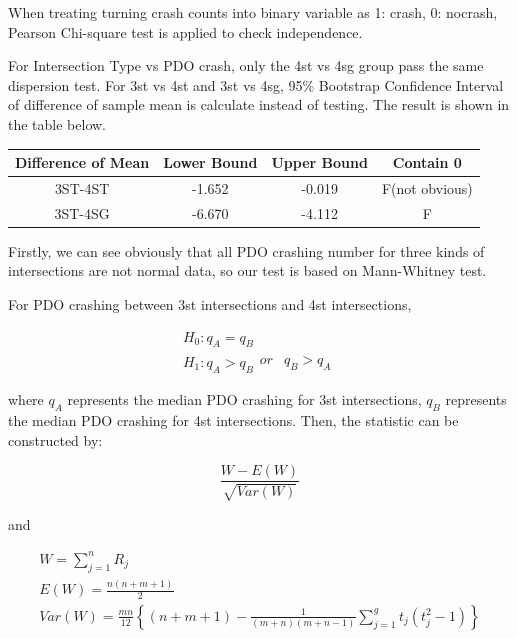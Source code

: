 \documentclass[11pt]{scrartcl} %
\begin{document}
When treating turning crash counts into binary variable as 1: crash, 0: nocrash, Pearson Chi-square test is applied to check independence.

For Intersection Type vs PDO crash, only the 4st vs 4sg group pass the same dispersion test. For 3st vs 4st and 3st vs 4sg, 95\% Bootstrap Confidence Interval of difference of sample mean is calculate instead of testing. The result is shown in the table below.

\begin{table}[H]
\begin{tabular}{|c|c|c|c|}
\hline
Difference of Mean  & Lower Bound & Upper Bound & Contain 0 \\
\hline
3ST-4ST & -1.652 & -0.019 & F(not obvious) \\
\hline
3ST-4SG   & -6.670  & -4.112  & F \\
\hline
\end{tabular}
\end{table}

Firstly, we can see obviously that all PDO crashing number for three kinds of intersections are not normal data, so our test is based on Mann-Whitney test.

\par

For PDO crashing between 3st intersections and 4st intersections,

\begin{equation*}
\begin{array}{l}
{H_0}:{q_A} = {q_B}\\
{H_1}:{q_A} > {q_B}\begin{array}{*{20}{c}}
{or}&{{q_B} > {q_A}}
\end{array}
\end{array}
\end{equation*}

where ${q_A}$ represents the median PDO crashing for 3st intersections, $q_B$ represents the median PDO crashing for 4st intersections. Then, the statistic can be constructed by:

\begin{equation*}
\frac{{W - E\left( W \right)}}{{\sqrt {Var\left( W \right)} }}
\end{equation*}

and

\begin{equation}
\label{mw-stat}
\begin{array}{l}
W = \sum\limits_{j = 1}^n {{R_j}} \\
E\left( W \right) = \frac{{n\left( {n + m + 1} \right)}}{2}\\
Var\left( W \right) = \frac{{mn}}{{12}}\left\{ {\left( {n + m + 1} \right) - \frac{1}{{\left( {m + n} \right)\left( {m + n - 1} \right)}}\sum\limits_{j = 1}^g {{t_j}\left( {t_j^2 - 1} \right)} } \right\}
\end{array}
\end{equation}
\end{document}
